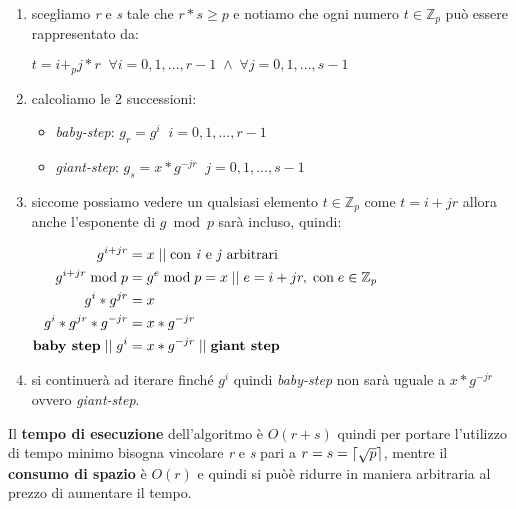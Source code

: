 \begin{enumerate}
    \item scegliamo \textit{r} e \textit{s} tale che $r * s \geq p$ e notiamo che ogni numero $t \in \mathbb{Z}_p$ può essere rappresentato da:
    \begin{center}
        $t = i +_p j * r \;\; \forall i = 0, 1, ..., r - 1 \; \land \; \forall j = 0, 1, ..., s - 1$
    \end{center}
    \item calcoliamo le 2 successioni:
    \begin{itemize}
        \item \textit{baby-step}: $g_r = g^i \;\; i = 0, 1, ..., r - 1$
        \item \textit{giant-step}: $g_s = x*g^{-j r} \;\; j = 0, 1, ..., s - 1$
    \end{itemize}
    \item siccome possiamo vedere un qualsiasi elemento $t \in \mathbb{Z}_p$ come $t = i + jr$ allora anche l'esponente di $g \bmod p$ sarà incluso, quindi:
    \begin{center}
        \begin{math}
            \begin{aligned}
                g^{i + jr} &= x \; || \; \text{con \textit{i} e \textit{j} arbitrari}\\
                g^{i + jr} \bmod p &= g^e \bmod p = x \; || \; e = i + jr, \; \text{con} \; e \in \mathbb{Z}_p \\
                g^i * g^{jr} &= x \\
                g^i * g^{jr} * g^{-jr} &= x * g^{-jr} \\
                \text{\textbf{baby step}} \; || \; g^i &= x * g^{-jr} \; || \; \text{\textbf{giant step}}
            \end{aligned}
        \end{math}
    \end{center}
    \item si continuerà ad iterare finché $g^i$ quindi \textit{baby-step} non sarà uguale a $x*g^{-jr}$ ovvero \textit{giant-step}.
\end{enumerate}
Il \textbf{tempo di esecuzione} dell'algoritmo è $O(r + s)$ quindi per portare l'utilizzo di tempo minimo bisogna vincolare \textit{r} e \textit{s} pari a $r = s = \lceil\sqrt{p}\rceil$, mentre il \textbf{consumo di spazio} è $O(r)$ e quindi si puòè ridurre in maniera arbitraria al prezzo di aumentare il tempo.
\\ \newline
